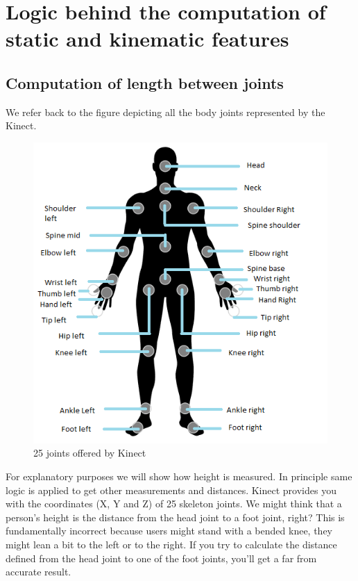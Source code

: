 \newpage

\section{Logic behind the computation of static and kinematic features}\label{Logic behind the computation of static and kinematic features} 

\subsection{Computation of length between joints}\label{Computation of length between joints} 

\noindent We refer back to the figure depicting all the body joints represented by the Kinect.\\
\begin{figure}[h]
\centering
\includegraphics[scale=0.85]{Figbodjoints.png}
\caption{25 joints offered by Kinect}
\label{fig:Figbodjoints.png}
\end{figure}
\noindent For explanatory purposes we will show how height is measured. In principle same logic is applied to get other measurements and distances.
Kinect provides you with the coordinates (X, Y and Z) of 25 skeleton joints. We might think that a person's height is the distance from the head joint to a foot joint, right? This is fundamentally incorrect because users might stand with a bended knee, they might lean a bit to the left or to the right. If you try to calculate the distance defined from the head joint to one of the foot joints, you'll get a far from accurate result.\\

